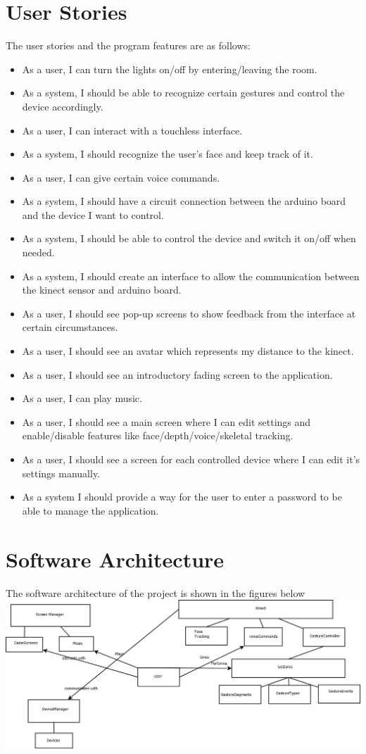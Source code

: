 \section{User Stories}

The user stories and the program features are as follows:
\begin{itemize}
\item As a user, I can turn the lights on/off by entering/leaving the room.
\item As a system, I should be able to recognize certain gestures and control the device accordingly.
\item As a user, I can interact with a touchless interface.
\item As a system, I should recognize the user's face and keep track of it.
\item As a user, I can give certain voice commands.
\item As a system, I should have a circuit connection between the arduino board and the device I want to control.
\item As a system, I should be able to control the device and switch it on/off when needed.
\item As a system, I should create an interface to allow the communication between the kinect sensor and arduino board.
\item As  a user, I should see pop-up screens to show feedback from the interface at certain circumstances.
\item As a user, I should see an avatar which represents my distance to the kinect.
\item As a user, I should see an introductory fading screen to the application.
\item As a user, I can play music.
\item As a user, I should see a main screen where I can edit settings and enable/disable features like face/depth/voice/skeletal tracking.
\item As a user, I should see a screen for each controlled device where I can edit it's settings manually.
\item As a system I should provide a way for the user to enter a password to be able to manage the application.
\end{itemize}

\section{Software Architecture}

The software architecture of the project is shown in the figures below
\includegraphics[width=0.8\linewidth]{SoftwareArchitecture}

